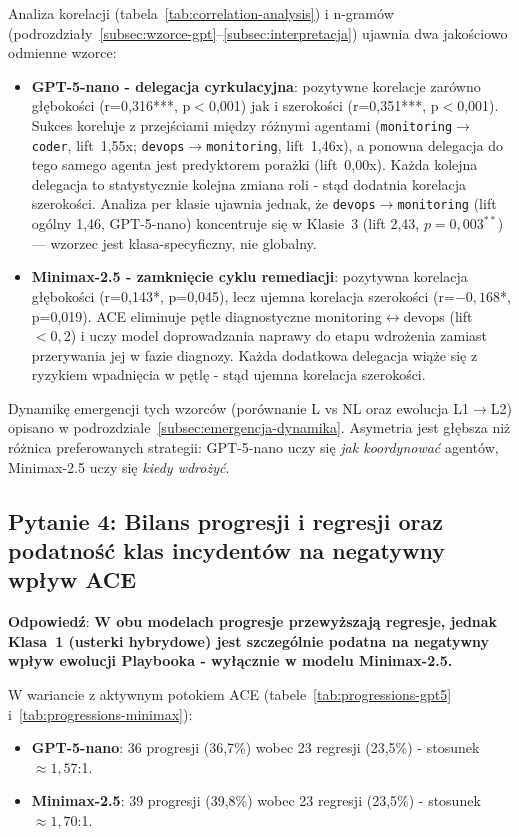Analiza korelacji (tabela~\ref{tab:correlation-analysis}) i n-gramów (podrozdziały~\ref{subsec:wzorce-gpt}--\ref{subsec:interpretacja}) ujawnia dwa jakościowo odmienne wzorce:

\begin{itemize}
    \item \textbf{GPT-5-nano - delegacja cyrkulacyjna}: pozytywne korelacje zarówno głębokości (r=0,316***, p$<$0,001) jak i szerokości (r=0,351***, p$<$0,001). Sukces koreluje z przejściami między różnymi agentami (\texttt{monitoring$\to$coder}, lift~1,55x; \texttt{devops$\to$monitoring}, lift~1,46x), a ponowna delegacja do tego samego agenta jest predyktorem porażki (lift~0,00x). Każda kolejna delegacja to statystycznie kolejna zmiana roli - stąd dodatnia korelacja szerokości. Analiza per klasie ujawnia jednak, że \texttt{devops$\to$monitoring} (lift ogólny 1,46, GPT-5-nano) koncentruje się w Klasie~3 (lift 2,43, $p=0{,}003^{**}$) --- wzorzec jest klasa-specyficzny, nie globalny.
    \item \textbf{Minimax-2.5 - zamknięcie cyklu remediacji}: pozytywna korelacja głębokości (r=0,143*, p=0,045), lecz ujemna korelacja szerokości (r=$-0{,}168$*, p=0,019). ACE eliminuje pętle diagnostyczne monitoring$\leftrightarrow$devops (lift~$<0{,}2$) i uczy model doprowadzania naprawy do etapu wdrożenia zamiast przerywania jej w fazie diagnozy. Każda dodatkowa delegacja wiąże się z ryzykiem wpadnięcia w pętlę - stąd ujemna korelacja szerokości.
\end{itemize}

Dynamikę emergencji tych wzorców (porównanie L vs NL oraz ewolucja L1$\to$L2) opisano w podrozdziale~\ref{subsec:emergencja-dynamika}. Asymetria jest głębsza niż różnica preferowanych strategii: GPT-5-nano uczy się \emph{jak koordynować} agentów, Minimax-2.5 uczy się \emph{kiedy wdrożyć}.

\subsection{Pytanie 4: Bilans progresji i regresji oraz podatność klas incydentów na negatywny wpływ ACE}

\textbf{Odpowiedź}: \textbf{W obu modelach progresje przewyższają regresje, jednak Klasa~1 (usterki hybrydowe) jest szczególnie podatna na negatywny wpływ ewolucji Playbooka - wyłącznie w modelu Minimax-2.5.}

W wariancie z aktywnym potokiem ACE (tabele~\ref{tab:progressions-gpt5} i~\ref{tab:progressions-minimax}):
\begin{itemize}
    \item \textbf{GPT-5-nano}: 36 progresji (36,7\%) wobec 23 regresji (23,5\%) - stosunek $\approx 1{,}57$:1.
    \item \textbf{Minimax-2.5}: 39 progresji (39,8\%) wobec 23 regresji (23,5\%) - stosunek $\approx 1{,}70$:1.
\end{itemize}

